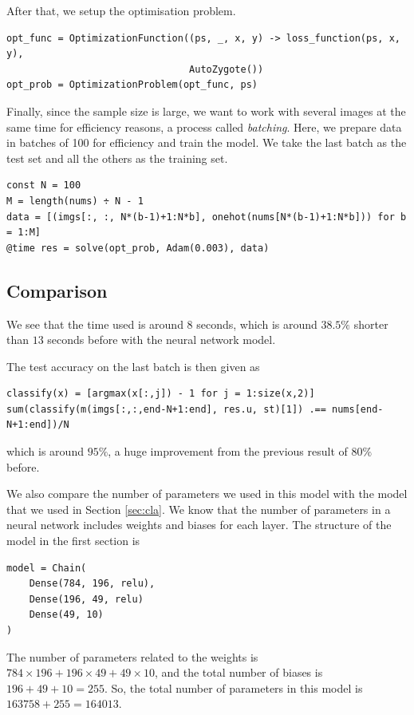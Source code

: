 \documentclass[a4paper,11pt,titlepage]{article}
\theoremstyle{definition}
\theoremstyle{plain}
\theoremstyle{remark}
\begin{document}
After that, we setup the optimisation problem.

\begin{verbatim}
opt_func = OptimizationFunction((ps, _, x, y) -> loss_function(ps, x, y),
                                AutoZygote())
opt_prob = OptimizationProblem(opt_func, ps)
\end{verbatim}

Finally, since the sample size is large, we want to work with several images at the same time for efficiency reasons, a process called \textit{batching}. Here, we prepare data in batches of 100 for efficiency and train the model. We take the last batch as the test set and all the others as the training set.

\begin{verbatim}
const N = 100
M = length(nums) ÷ N - 1
data = [(imgs[:, :, N*(b-1)+1:N*b], onehot(nums[N*(b-1)+1:N*b])) for b = 1:M]
@time res = solve(opt_prob, Adam(0.003), data)
\end{verbatim}

\subsection{Comparison}

We see that the time used is around $8$ seconds, which is around $38.5\%$ shorter than $13$ seconds before with the neural network model.

The test accuracy on the last batch is then given as

\begin{verbatim}
classify(x) = [argmax(x[:,j]) - 1 for j = 1:size(x,2)]
sum(classify(m(imgs[:,:,end-N+1:end], res.u, st)[1]) .== nums[end-N+1:end])/N
\end{verbatim}

which is around $95\%$, a huge improvement from the previous result of $80\%$ before.

We also compare the number of parameters we used in this model with the model that we used in Section \ref{sec:cla}. We know that the number of parameters in a neural network includes weights and biases for each layer. The structure of the model in the first section is

\begin{verbatim}
model = Chain(
    Dense(784, 196, relu),
    Dense(196, 49, relu)
    Dense(49, 10)
)
\end{verbatim}

The number of parameters related to the weights is $784\times 196+196\times 49+49\times 10$, and the total number of biases is $196+49+10=255$. So, the total number of parameters in this model is $163758+255=164013$.
\end{document}
